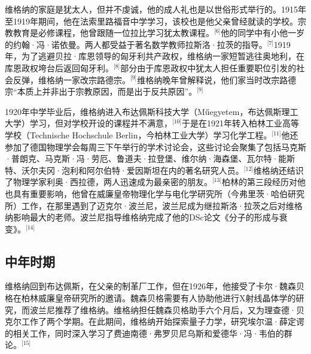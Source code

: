 维格纳的家庭是犹太人，但并不虔诚，他的成人礼也是以世俗形式举行的。1915年至1919年期间，他在法索里路福音中学学习，该校也是他父亲曾经就读的学校。宗教教育是必修课程，他曾跟随一位拉比学习犹太教课程。\(^\text{[6]}\)他的同学中有小他一岁的约翰·冯·诺依曼。两人都受益于著名数学教师拉斯洛·拉茨的指导。\(^\text{[7]}\)1919年，为了逃避贝拉·库恩领导的匈牙利共产政权，维格纳一家短暂逃往奥地利，在库恩政权垮台后返回匈牙利。\(^\text{[8]}\)部分由于库恩政权中犹太人担任重要职位引发的社会反弹，维格纳一家改宗路德宗。\(^\text{[9]}\)维格纳晚年曾解释说，他们家当时改宗路德宗“本质上并非出于宗教原因，而是出于反共原因”。\(^\text{[9]}\)

1920年中学毕业后，维格纳进入布达佩斯科技大学（Műegyetem，布达佩斯理工大学）学习，但对学校开设的课程并不满意，\(^\text{[10]}\)于是在1921年转入柏林工业高等学校（Technische Hochschule Berlin，今柏林工业大学）学习化学工程。\(^\text{[11]}\)他还参加了德国物理学会每周三下午举行的学术讨论会，这些讨论会聚集了包括马克斯·普朗克、马克斯·冯·劳厄、鲁道夫·拉登堡、维尔纳·海森堡、瓦尔特·能斯特、沃尔夫冈·泡利和阿尔伯特·爱因斯坦在内的著名研究人员。\(^\text{[12]}\)维格纳还结识了物理学家利奥·西拉德，两人迅速成为最亲密的朋友。\(^\text{[13]}\)柏林的第三段经历对他也具有重要影响，他曾在威廉皇帝物理化学与电化学研究所（今弗里茨·哈伯研究所）工作，在那里遇到了迈克尔·波兰尼，波兰尼成为继拉斯洛·拉茨之后对维格纳影响最大的老师。波兰尼指导维格纳完成了他的DSc论文《分子的形成与衰变》。\(^\text{[14]}\)
\subsection{中年时期}
维格纳回到布达佩斯，在父亲的制革厂工作，但在1926年，他接受了卡尔·魏森贝格在柏林威廉皇帝研究所的邀请。魏森贝格需要有人协助他进行X射线晶体学的研究，而波兰尼推荐了维格纳。维格纳担任魏森贝格助手六个月后，又为理查德·贝克尔工作了两个学期。在此期间，维格纳开始探索量子力学，研究埃尔温·薛定谔的相关工作，同时深入学习了费迪南德·弗罗贝尼乌斯和爱德华·冯·韦伯的群论。\(^\text{[15]}\)

